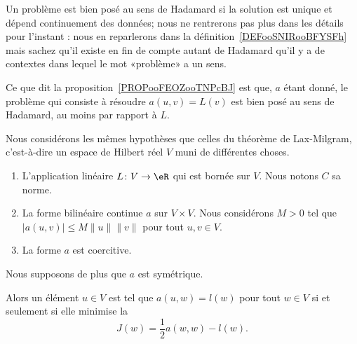 Un problème est bien posé au sens de Hadamard si la solution est unique et dépend continuement des données; nous ne rentrerons pas plus dans les détails pour l'instant : nous en reparlerons dans la définition~\ref{DEFooSNIRooBFYSFh} mais sachez qu'il existe en fin de compte autant de Hadamard qu'il y a de contextes dans lequel le mot «problème» a un sens.

Ce que dit la proposition~\ref{PROPooFEOZooTNPcBJ} est que, \( a\) étant donné, le problème qui consiste à résoudre \( a(u,v)=L(v)\) est bien posé au sens de Hadamard, au moins par rapport à \( L\).

\begin{theorem}
	Nous considérons les mêmes hypothèses que celles du théorème de Lax-Milgram, c'est-à-dire un espace de Hilbert réel \( V\) muni de différentes choses.
	\begin{enumerate}
		\item
		      L'application linéaire \( L\colon V\to \eR\) qui est bornée sur \( V\). Nous notons \( C\) sa norme.
		\item
		      La forme bilinéaire continue \( a\) sur \( V\times V\). Nous considérons \( M>0\) tel que \( | a(u,v) |\leq M\| u \|\| v \|\) pour tout \( u,v\in V\).
		\item
		      La forme \( a\) est coercitive.
	\end{enumerate}
	Nous supposons de plus que \( a\) est symétrique.

	Alors un élément \( u\in V\) est tel que \( a(u,w)=l(w)\) pour tout \( w\in V\) si et seulement si elle minimise la 
	\begin{equation}
		J(w)=\frac{ 1 }{2}a(w,w)-l(w).
	\end{equation}
\end{theorem}

